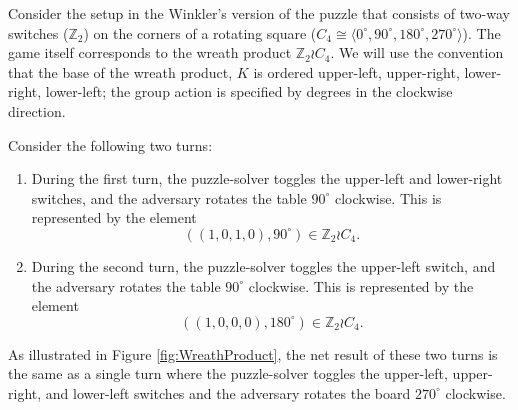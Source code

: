 \begin{example}
  Consider the setup in the Winkler's version of the puzzle that consists of
  two-way switches ($\mathbb Z_2$) on the corners of a rotating square
  ($C_4 \cong \langle 0^\circ, 90^\circ, 180^\circ, 270^\circ \rangle$).
  The game itself corresponds to the wreath product $\mathbb Z_2 \wr C_4$.
  We will use the convention that the base of the wreath product, $K$ is
  ordered upper-left, upper-right, lower-right, lower-left; the group
  action is specified by degrees in the clockwise direction.

  Consider the following two turns:
  \begin{enumerate}
    \item During the first turn,
    the puzzle-solver toggles the upper-left and lower-right switches, and
    the adversary rotates the table $90^\circ$ clockwise.
    This is represented by the element \begin{equation}
      ((1,0,1,0), 90^\circ) \in \mathbb Z_2 \wr C_4.
    \end{equation}
    \item During the second turn,
    the puzzle-solver toggles the upper-left switch, and
    the adversary rotates the table $90^\circ$ clockwise.
    This is represented by the element \begin{equation}
      ((1,0,0,0), 180^\circ) \in \mathbb Z_2 \wr C_4.
    \end{equation}
  \end{enumerate}
  As illustrated in Figure \ref{fig:WreathProduct},
  the net result of these two turns is the same as
  a single turn where the puzzle-solver toggles the
  upper-left, upper-right, and lower-left
  switches and the adversary rotates the board $270^\circ$ clockwise.

  \begin{figure}
    \center
\end{figure}
\end{example}
